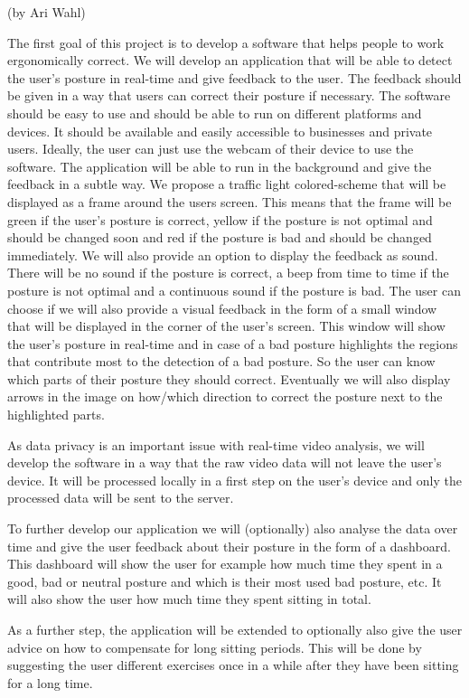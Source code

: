 (by Ari Wahl)

The first goal of this project is to develop a software that helps people to work
ergonomically correct. We will develop an application that will be able to detect the user's posture in real-time
and give feedback to the user. The feedback should be given in a way that users
can correct their posture if necessary. The software should be easy to use and should be able to run on 
different platforms and devices. It should be available and easily accessible to businesses and private users. Ideally, the user
can just use the webcam of their device to use the software. The application will be able to run in the background
and give the feedback in a subtle way. We propose a traffic light colored-scheme that will be displayed as a frame
around the users screen. This means that the frame will be green if the user's posture is correct, yellow if the posture is not optimal 
and should be changed soon and red if the posture is bad and should be changed immediately. 
We will also provide an option to display the feedback as sound. There will be no sound if the posture is correct, a
beep from time to time if the posture is not optimal and a continuous sound if the posture is bad. 
The user can choose if we will also provide a visual feedback in the form of a small window that will be displayed in the corner of the user's screen.
This window will show the user's posture in real-time and in case of a bad posture highlights the regions that contribute most to the detection of a bad posture.
So the user can know which parts of their posture they should correct. Eventually we will also display arrows
in the image on how/which direction to correct the posture next to the highlighted parts.

As data privacy is an important issue with real-time video analysis, we will develop the software in a way that the raw video data
will not leave the user's device. It will be processed locally in a first step on the user's device and only the processed data will be sent to the server.

To further develop our application we will (optionally) also analyse the data over time and give the user feedback about their posture 
in the form of a dashboard. This dashboard will show the user for example how much time they spent in a good, bad or neutral posture
and which is their most used bad posture, etc. It will also show the user how much time they spent sitting in total. 

As a further step, the application will be extended to optionally also give the user advice on how to compensate for long sitting periods.
This will be done by suggesting the user different exercises once in a while after they have been sitting for a long time.  

